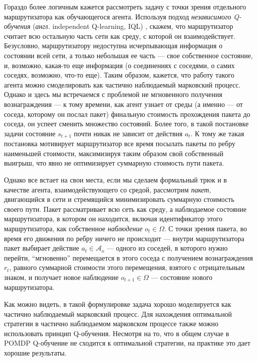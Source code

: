 \documentclass[specification,annotation,times]{itmo-student-thesis}
\theoremstyle{definition}
\begin{document}
Гораздо более логичным кажется рассмотреть задачу с точки зрения отдельного
маршрутизатора как обучающегося агента. Используя подход \textit{независимого
  Q-обучения} (\textit{англ.} independent Q-learning, IQL) \cite{tan1993multi},
скажем, что маршрутизатор считает всю остальную часть сети как среду, с которой
он взаимодействует. Безусловно, маршрутизатору недоступна исчерпывающая
информация о состоянии всей сети, а только небольшая ее часть --- свое
собственное состояние, и, возможно, какая-то еще информация (о соединениях с
соседями, о самих соседях, возможно, что-то еще). Таким образом, кажется, что
работу такого агента можно смоделировать как частично наблюдаемый марковский
процесс. Однако и
здесь мы встречаемся с проблемой не мгновенного получения вознаграждения --- к
тому времени, как агент узнает от среды (а именно --- от соседа, которому он
послал пакет) финальную стоимость прохождения пакета до соседа, он успеет
сменить множество состояний. Более того, в такой постановке задачи состояние
$s_{t+1}$ почти никак не зависит от действия $a_t$. К тому же такая постановка
мотивирует маршрутизатор все время посылать пакеты по ребру наименьшей
стоимости, максимизируя таким образом свой собственный выигрыш, что явно не
оптимизирует суммарную стоимость пути пакета.

Однако все встает на свои места, если мы сделаем формальный трюк и в качестве
агента, взаимодействующего со средой, рассмотрим \textit{пакет}, двигающийся в
сети и стремящийся минимизировать суммарную стоимость своего пути. Пакет
рассматривает всю сеть как среду, а наблюдаемое состояние маршрутизатора, в
котором он находится, включая идентификатор этого маршрутизатора, как
собственное \textit{наблюдение}  $o_t \in \Omega$. С точки зрения пакета, во время
его движения по ребру ничего не происходит --- внутри маршрутизатора пакет
выбирает действие $a_t \in \mathcal{A}_o$ --- одного из соседей, в которого нужно
перейти, \enquote{мгновенно} перемещается в этого соседа с получением вознаграждения $r_t$,
равного суммарной стоимости этого перемещения, взятого с отрицательным знаком, и
получает новое наблюдение $o_{t+1} \in \Omega$ --- состояние нового маршрутизатора.

Как можно видеть, в такой формулировке задача хорошо моделируется как частично
наблюдаемый марковский процесс. Для нахождения оптимальной стратегии в частично
наблюдаемом марковском процессе также можно использовать принцип Q-обучения.
Несмотря на то, что в общем случае в POMDP Q-обучение не сходится к оптимальной
стратегии, на практике это дает хорошие результаты.
\end{document}
